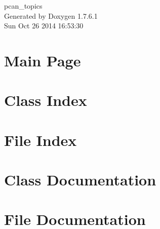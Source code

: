 \documentclass[a4paper]{book}
\begin{document}
\begin{titlepage}
\vspace*{7cm}
\begin{center}
{\Large pcan\-\_\-topics }\\
\vspace*{1cm}
{\large \-Generated by Doxygen 1.7.6.1}\\
\vspace*{0.5cm}
{\small Sun Oct 26 2014 16:53:30}\\
\end{center}
\end{titlepage}
\clearemptydoublepage
{}
\tableofcontents
\clearemptydoublepage
{}
\chapter{\-Main \-Page}
\label{index}
\chapter{\-Class \-Index}

\chapter{\-File \-Index}

\chapter{\-Class \-Documentation}


\chapter{\-File \-Documentation}









\printindex
\end{document}
